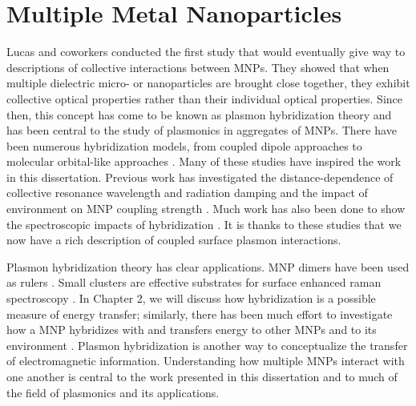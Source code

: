 \documentclass [11pt, proquest] {uwthesis}[2016/11/22]
\begin{document}
\section{Multiple Metal Nanoparticles}

Lucas and coworkers \cite{Lucas1976} conducted the first study that would eventually give way to descriptions of collective interactions between MNPs. They showed that when multiple dielectric micro- or nanoparticles are brought close together, they exhibit collective optical properties rather than their individual optical properties. Since then, this concept has come to be known as plasmon hybridization theory and has been central to the study of plasmonics in aggregates of MNPs. There have been numerous hybridization models, from coupled dipole approaches \cite{Schatz2003} to molecular orbital-like approaches \cite{Oubre2004,NordProdan2004}. Many of these studies have inspired the work in this dissertation. Previous work has investigated the distance-dependence of collective resonance wavelength and radiation damping \cite{vonPlessen2007} and the impact of environment on MNP coupling strength \cite{Elsayed2008}. Much work has also been done to show the spectroscopic impacts of hybridization \cite{Xu1995,Mischenko1995}. It is thanks to these studies that we now have a rich description of coupled surface plasmon interactions.

Plasmon hybridization theory has clear applications. MNP dimers have been used as rulers \cite{Ruler}. Small clusters are effective substrates for surface enhanced raman spectroscopy \cite{SERS}. In Chapter 2, we will discuss how hybridization is a possible measure of energy transfer; similarly, there has been much effort to investigate how a MNP hybridizes with and transfers energy to other MNPs and to its environment \cite{CubeSubstrate,ARAVIND1981,ThakkarLandau}. Plasmon hybridization is another way to conceptualize the transfer of electromagnetic information. Understanding how multiple MNPs interact with one another is central to the work presented in this dissertation and to much of the field of plasmonics and its applications.
\end{document}

